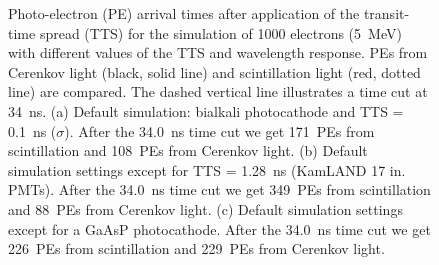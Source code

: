 \documentclass[aps,prc,twocolumn,groupedaddress,showpacs,amsmath,amssymb,floatfix,superscriptaddress]{revtex4}
\begin{document}
\begin{figure}[tbh]
\begin{center}
        \caption[]{Photo-electron (PE) arrival times after application
        of the transit-time spread (TTS) for the simulation
        of 1000 electrons (5~MeV) with different values of the TTS and
        wavelength response. PEs from
        Cerenkov light (black, solid line) and scintillation light
        (red, dotted line) are
        compared. The dashed vertical line illustrates a time cut at
        34~ns. (a) Default simulation: bialkali photocathode and TTS =
        0.1~ns ($\sigma$). After the 34.0~ns time cut we get 171~PEs
        from scintillation and 108~PEs from Cerenkov light. (b)
        Default simulation settings except for TTS = 1.28~ns (KamLAND
        17 in. PMTs). After the 34.0~ns time cut we get 349~PEs from
        scintillation and 88~PEs from Cerenkov light. (c) Default
        simulation settings except for a GaAsP photocathode. After the
        34.0~ns time cut we get 226~PEs from scintillation and 229~PEs
        from Cerenkov light. \label{time_plots_comparison}}
        \end{center}
\end{figure}
\end{document}
